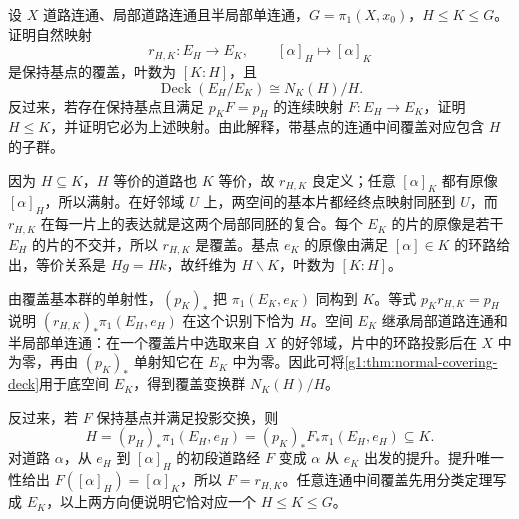\begin{exercise}\label{g1:ex:intermediate-covering}
	设 \(X\) 道路连通、局部道路连通且半局部单连通，\(G=\pi_1(X,x_0)\)，\(H\le K\le G\)。证明自然映射
	\[
		r_{H,K}:E_H\longrightarrow E_K,\qquad [\alpha]_H\longmapsto[\alpha]_K
	\]
	是保持基点的覆盖，叶数为 \([K:H]\)，且
	\[
		\operatorname{Deck}(E_H/E_K)\cong N_K(H)/H.
	\]
	反过来，若存在保持基点且满足 \(p_KF=p_H\) 的连续映射 \(F:E_H\to E_K\)，证明 \(H\le K\)，并证明它必为上述映射。由此解释，带基点的连通中间覆盖对应包含 \(H\) 的子群。
\end{exercise}
\begin{solution}
	因为 \(H\subseteq K\)，\(H\) 等价的道路也 \(K\) 等价，故 \(r_{H,K}\) 良定义；任意 \([\alpha]_K\) 都有原像 \([\alpha]_H\)，所以满射。在好邻域 \(U\) 上，两空间的基本片都经终点映射同胚到 \(U\)，而 \(r_{H,K}\) 在每一片上的表达就是这两个局部同胚的复合。每个 \(E_K\) 的片的原像是若干 \(E_H\) 的片的不交并，所以 \(r_{H,K}\) 是覆盖。基点 \(e_K\) 的原像由满足 \([\alpha]\in K\) 的环路给出，等价关系是 \(Hg=Hk\)，故纤维为 \(H\backslash K\)，叶数为 \([K:H]\)。

	由覆盖基本群的单射性，\((p_K)_*\) 把 \(\pi_1(E_K,e_K)\) 同构到 \(K\)。等式 \(p_Kr_{H,K}=p_H\) 说明 \((r_{H,K})_*\pi_1(E_H,e_H)\) 在这个识别下恰为 \(H\)。空间 \(E_K\) 继承局部道路连通和半局部单连通：在一个覆盖片中选取来自 \(X\) 的好邻域，片中的环路投影后在 \(X\) 中为零，再由 \((p_K)_*\) 单射知它在 \(E_K\) 中为零。因此可将\cref{g1:thm:normal-covering-deck}用于底空间 \(E_K\)，得到覆盖变换群 \(N_K(H)/H\)。

	反过来，若 \(F\) 保持基点并满足投影交换，则
	\[
		H=(p_H)_*\pi_1(E_H,e_H)
		=(p_K)_*F_*\pi_1(E_H,e_H)\subseteq K.
	\]
	对道路 \(\alpha\)，从 \(e_H\) 到 \([\alpha]_H\) 的初段道路经 \(F\) 变成 \(\alpha\) 从 \(e_K\) 出发的提升。提升唯一性给出 \(F([\alpha]_H)=[\alpha]_K\)，所以 \(F=r_{H,K}\)。任意连通中间覆盖先用分类定理写成 \(E_K\)，以上两方向便说明它恰对应一个 \(H\le K\le G\)。
\end{solution}

